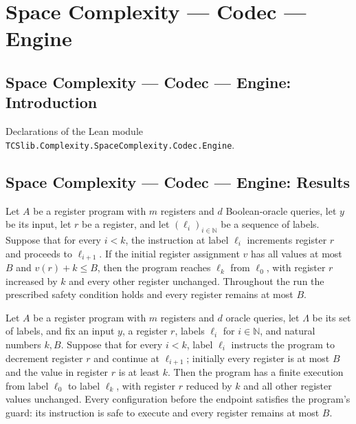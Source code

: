 \section{Space Complexity --- Codec --- Engine}
\subsection*{Space Complexity --- Codec --- Engine: Introduction}

Declarations of the Lean module \texttt{TCSlib.Complexity.SpaceComplexity.Codec.Engine}.

\subsection*{Space Complexity --- Codec --- Engine: Results}

\begin{theorem}
\label{Complexity.Codec.incChain}
\leanok
{}
Let $A$ be a register program with $m$ registers and $d$ Boolean-oracle queries, let $y$
be its input, let $r$ be a register, and let $(\ell_i)_{i\in\mathbb{N}}$ be a sequence of
labels. Suppose that for every $i<k$, the instruction at label $\ell_i$ increments
register $r$ and proceeds to $\ell_{i+1}$. If the initial register assignment $v$ has
all values at most $B$ and $v(r)+k\le B$, then the program reaches $\ell_k$ from
$\ell_0$, with register $r$ increased by $k$ and every other register unchanged.
Throughout the run the prescribed safety condition holds and every register remains
at most $B$.
\end{theorem}

\begin{theorem}
\label{Complexity.Codec.decChain}
\leanok
{}
Let $A$ be a register program with $m$ registers and $d$ oracle queries, let $\Lambda$
be its set of labels, and fix an input $y$, a register $r$, labels $\ell_i$ for
$i\in\mathbb N$, and natural numbers $k,B$. Suppose that for every $i<k$, label $\ell_i$
instructs the program to decrement register $r$ and continue at $\ell_{i+1}$; initially
every register is at most $B$ and the value in register $r$ is at least $k$. Then the
program has a finite execution from label $\ell_0$ to label $\ell_k$, with register $r$
reduced by $k$ and all other register values unchanged. Every configuration before the
endpoint satisfies the program's guard: its instruction is safe to execute and every
register remains at most $B$.
\end{theorem}

